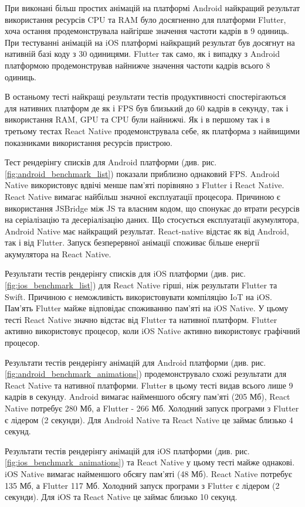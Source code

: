 При виконані більш простих анімацій на платформі Android найкращий результат використання ресурсів CPU та RAM було
досягненно для платформи Flutter, хоча остання продемонструвала найгірше значення частоти кадрів в 9 одиниць.
При тестуванні анімацій на iOS платформі найкращий результат був досягнут на нативній базі коду з 30 одиницями.
Flutter так само, як і випадку з Android платформою продемонстрував найнижче значення частоти кадрів всього 8 одиниць.

В останьому тесті найкращі результати тестів продуктивності спостерігаються для нативних платформ де як і FPS був близький до 60 кадрів в секунду,
так і використання RAM, GPU та CPU були найнижчі. Як і в першому так і в третьому тестах React Native продемонструвала
себе, як платформа з найвищими показниками використання ресурсів пристрою.

Тест рендерінгу списків для Android платформи (див. рис. \ref{fig:android_benchmark_list}) показали приблизно однаковий FPS.
Android Native використовує вдвічі менше пам'яті порівняно з Flutter і React Native.
React Native вимагає найбільш значної експлуатації процесора.
Причиною є використання JSBridge між JS та власним кодом, що спонукає до втрати ресурсів на серіалізацію та десеріалізацію даних.
Що стосується експлуатації акумулятора, Android Native має найкращий результат.
React-native відстає як від Android, так і від Flutter.
Запуск безперервної анімації споживає більше енергії акумулятора на React Native.

Результати тестів рендерінгу списків для iOS платформи (див. рис. \ref{fig:ios_benchmark_list}) для React Native гірші, ніж результати Flutter та Swift.
Причиною є неможливість використовувати компіляцію IoT на iOS.
Пам'ять Flutter майже відповідає споживанню пам'яті на iOS Native.
У цьому тесті React Native значно відстає від Flutter та нативної платформ.
Flutter активно використовує процесор, коли iOS Native активно використовує графічний процесор.

Результати тестів рендерінгу анімацій для Android платформи (див. рис. \ref{fig:android_benchmark_animations})
продемонструвало схожі результати для React Native та нативної платформи.
Flutter в цьому тесті видав всього лише 9 кадрів в секунду.
Android вимагає найменшого обсягу пам'яті (205 Мб), React Native потребує 280 Мб, а Flutter - 266 Мб.
Холодний запуск програми з Flutter є лідером (2 секунди).
Для Android Native та React Native це займає близько 4 секунд.

Результати тестів рендерінгу анімацій для iOS платформи (див. рис. \ref{fig:ios_benchmark_animations})
та React Native у цьому тесті майже однакові.
iOS Native вимагає найменшого обсягу пам'яті (48 Мб). React Native потребує 135 Мб, а Flutter 117 Мб.
Холодний запуск програми з Flutter є лідером (2 секунди).
Для iOS та React Native це займає близько 10 секунд.

